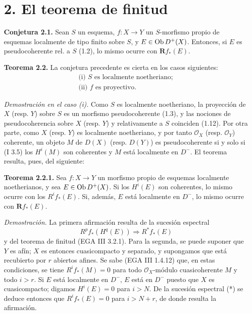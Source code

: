 \providecommand{\sisi}[2]{#2}

\section*{2. El teorema de finitud}

\textbf{Conjetura 2.1.} Sean \(S\) un esquema, \(f:X\to Y\) un \(S\)-morfismo propio de esquemas localmente de tipo finito sobre \(S\), y \(E\in\operatorname{Ob} D^+(X)\). Entonces, si \(E\) es pseudocoherente rel. a \(S\) (1.2), lo mismo ocurre con \(\mathbf Rf_*(E)\).

\textbf{Teorema 2.2.} La conjetura precedente es cierta en los casos siguientes:
\[
\begin{gathered}
 \text{(i) } S\text{ es localmente noetheriano};\\
 \text{(ii) } f\text{ es proyectivo}.
\end{gathered}
\]

\emph{Demostración en el caso (i).} Como \(S\) es localmente noetheriano, la proyección de \(X\) (resp. \(Y\)) sobre \(S\) es un morfismo pseudocoherente (1.3), y las nociones de pseudocoherencia sobre \(X\) (resp. \(Y\)) y relativamente a \(S\) coinciden (1.12). Por otra parte, como \(X\) (resp. \(Y\)) es localmente noetheriano, y por tanto \(\mathcal O_X\) (resp. \(\mathcal O_Y\)) coherente, un objeto \(M\) de \(D(X)\) (resp. \(D(Y)\)) es pseudocoherente si y solo si (I 3.5) los \(H^i(M)\) son coherentes y \(M\) está localmente en \(D^{-}\). El teorema resulta, pues, del siguiente:

\textbf{Teorema 2.2.1.} Sea \(f:X\to Y\) un morfismo propio de esquemas localmente noetherianos, y sea \(E\in\operatorname{Ob} D^+(X)\). Si los \(H^i(E)\) son coherentes, lo mismo ocurre con los \(R^if_*(E)\). Si, además, \(E\) está localmente en \(D^{-}\), lo mismo ocurre con \(\mathbf Rf_*(E)\).

\emph{Demostración.} La primera afirmación resulta de la sucesión espectral
\begin{equation}\tag{$*$}
 R^pf_*(H^q(E)) \Longrightarrow R^*f_*(E)
\end{equation}
y del teorema de finitud (EGA III 3.2.1). Para la segunda, se puede suponer que \(Y\) es afín; \(X\) es entonces cuasicompacto y separado, y supongamos que está recubierto por \(r\) abiertos afines. Se sabe (EGA III 1.4.12) que, en estas condiciones, se tiene \(R^if_*(M)=0\) para todo \(\mathcal O_X\)-módulo cuasicoherente \(M\) y todo \(i>r\). Si \(E\) está localmente en \(D^{-}\), \(E\) está en \(D^{-}\) puesto que \(X\) es cuasicompacto; digamos \(H^i(E)=0\) para \(i>N\). De la sucesión espectral (*) se deduce entonces que \(R^if_*(E)=0\) para \(i>N+r\), de donde resulta la afirmación.

